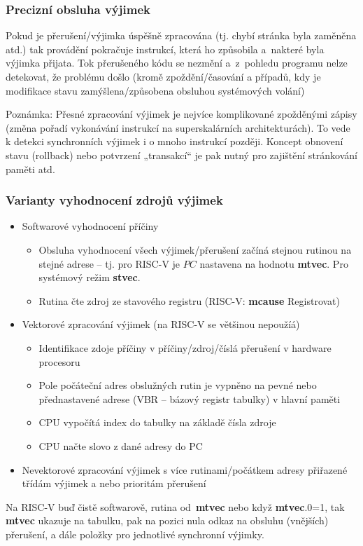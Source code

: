 \documentclass{beamer}
\begin{document}
\begin{frame}
\frametitle{Precizní obsluha výjimek}

Pokud je přerušení/výjimka úspěšně zpracována (tj. chybí
stránka byla zaměněna atd.) tak provádění pokračuje
instrukcí, která ho způsobila a~nakteré byla výjimka přijata.
Tok přerušeného kódu se nezmění a~z~pohledu programu nelze
detekovat, že problému došlo (kromě zpoždění/časování a případů,
kdy je modifikace  stavu zamýšlena/způsobena obsluhou systémových
volání)

\vspace{3mm}

Poznámka: Přesné zpracování výjimek je nejvíce komplikované
zpožděnými zápisy (změna pořadí vykonávání instrukcí na superskalárních architekturách).
To vede k detekci synchronních výjimek i o mnoho
instrukcí později. Koncept obnovení stavu (rollback) nebo
potvrzení „transakcí“ je pak nutný pro zajištění stránkování paměti atd.
\end{frame}

\begin{frame}
\frametitle{Varianty vyhodnocení zdrojů výjimek}

\begin{itemize}
 \item Softwarové vyhodnocení příčiny
 \begin{itemize}
  \item Obsluha vyhodnocení všech výjimek/přerušení začíná stejnou rutinou na stejné adrese --
        tj. pro RISC-V je $PC$ nastavena na hodnotu \textbf{mtvec}. Pro systémový režim \textbf{stvec}.
  \item Rutina čte zdroj ze stavového registru (RISC-V: \textbf{mcause} Registrovat)
 \end{itemize}
 \item Vektorové zpracování výjimek (na RISC-V se většinou nepoužíá)
 \begin{itemize}
  \item Identifikace zdoje příčiny v příčiny/zdroj/číslá přerušení v hardware procesoru
  \item Pole počáteční adres obslužných rutin je vypněno na pevné nebo přednastavené adrese
  (VBR -- bázový registr tabulky) v hlavní paměti
  \item CPU vypočítá index do tabulky na základě čísla zdroje
  \item CPU načte slovo z dané adresy do PC
 \end{itemize}
 \item Nevektorové zpracování výjimek s více rutinami/počátkem
       adresy přiřazené třídám výjimek a nebo prioritám přerušení
\end{itemize}

\footnotesize

Na RISC-V buď čistě softwarově, rutina od~\textbf{mtvec} nebo když \textbf{mtvec}.0=1, tak \textbf{mtvec} ukazuje na tabulku,
pak na pozici nula odkaz na obsluhu (vnějších) přerušení, a dále položky pro jednotlivé synchronní výjimky.
\end{frame}
\end{document}
